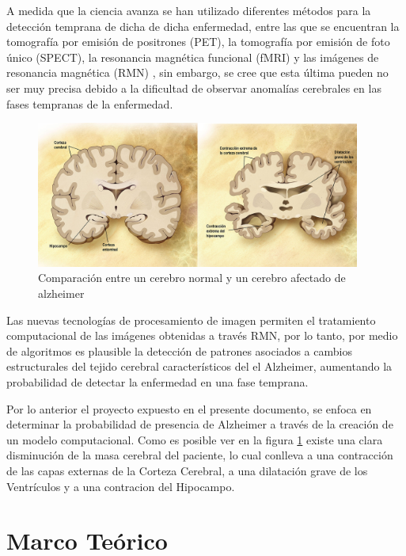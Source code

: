 \documentclass[12pt]{article}
\begin{document}
A medida que la ciencia avanza se han utilizado diferentes métodos para la detección temprana de dicha de dicha enfermedad, entre las que se encuentran la tomografía por emisión de positrones (PET), la tomografía por emisión de  foto único (SPECT), la resonancia magnética funcional (fMRI) y las imágenes de resonancia magnética (RMN) \cite{masdeujose2004}, sin embargo, se cree que esta última pueden no ser muy precisa debido a la dificultad de observar anomalías cerebrales en las fases tempranas de la enfermedad.




\begin{figure}[htb]
\centering
\includegraphics[width=0.95\textwidth]{Alzheimer}
\caption{Comparación entre un cerebro normal y un cerebro afectado de alzheimer\cite{wiki:Alz}} \label{A1}
\end{figure}

 Las nuevas tecnologías de procesamiento de imagen permiten el tratamiento computacional de las imágenes obtenidas a través RMN, por lo tanto, por medio de algoritmos es plausible la detección de patrones asociados a cambios estructurales del tejido cerebral característicos del el Alzheimer, aumentando la probabilidad de detectar la enfermedad en una fase temprana. 
 
 Por lo anterior el proyecto expuesto en el presente documento,  se enfoca en determinar la probabilidad de presencia de Alzheimer a través de la creación de un modelo computacional. Como es posible ver  en la figura \ref{A1} existe una clara disminución de la masa cerebral del paciente, lo cual conlleva a una contracción de las capas externas de la Corteza Cerebral, a una dilatación grave de los Ventrículos y a una contracion del Hipocampo. 

  
\section{\color{Black}Marco Teórico}
\justifying
\end{document}
